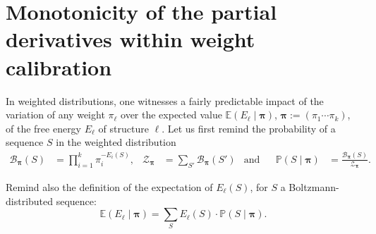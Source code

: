 \documentclass[10pt]{article}
\newcommand{\partfun}[1]{\mathcal{Z}_{#1}}
\begin{document}
\section{Monotonicity of the partial derivatives within weight calibration}
\label{sec:weight_derivatives}
%
In weighted distributions, one witnesses a fairly predictable impact of the variation of any weight $\pi_\ell$ over the expected value $\mathbb{E}(E_\ell\mid \pmb{\pi})$, $\pmb{\pi}:= (\pi_1\cdots\pi_k)$, of the free energy $E_\ell$ of structure $\ell$.  Let us  first remind the probability of a sequence $S$ in the weighted distribution
\begin{align*}
  \mathcal{B}_{\pmb{\pi}}(S) &= \prod_{i=1}^{k} \pi_i^{-E_i(S)}, &
  \partfun{\pmb{\pi}}&=\sum_{S'}\mathcal{B}_{\pmb{\pi}}(S') &
    \text{and}& &
  \mathbb{P}(S\mid \pmb{\pi}) &= \frac{\mathcal{B}_{\pmb{\pi}}(S)}{\partfun{\pmb{\pi}}}.
  \end{align*}

Remind also the definition of the expectation of $E_\ell(S)$, for $S$ a Boltzmann-distributed sequence:
$$\mathbb{E}(E_\ell\mid \pmb{\pi}) = \sum_S E_\ell(S)\cdot \mathbb{P}(S\mid \pmb{\pi}).$$
\end{document}
